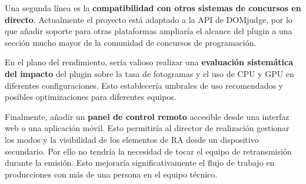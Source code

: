 Una segunda línea es la \textbf{compatibilidad con otros sistemas de concursos en directo}. Actualmente el proyecto está adaptado a la API de DOMjudge, por lo que añadir soporte para otras plataformas ampliaría el alcance del plugin a una sección mucho mayor de la comunidad de concursos de programación.

En el plano del rendimiento, sería valioso realizar una \textbf{evaluación sistemática del impacto} del plugin sobre la tasa de fotogramas y el uso de CPU y GPU en diferentes configuraciones. Esto establecería umbrales de uso recomendados y posibles optimizaciones para diferentes equipos.

Finalmente, añadir un \textbf{panel de control remoto} accesible desde una interfaz web o una aplicación móvil. Esto permitiría al director de realización gestionar los modos y la visibilidad de los elementos de RA desde un dispositivo secundario. Por ello no tendría la necesidad de tocar el equipo de retransmisión durante la emisión. Esto mejoraría significativamente el flujo de trabajo en producciones con más de una persona en el equipo técnico.
